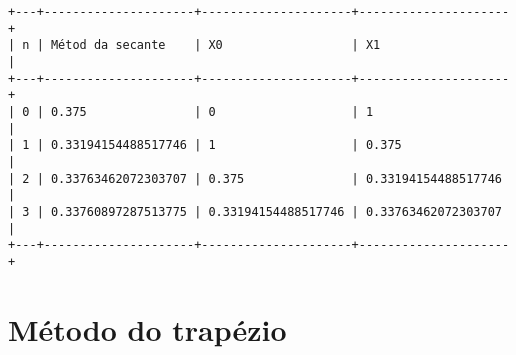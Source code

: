 \documentclass[11pt]{article}
\begin{document}
    \begin{Verbatim}[commandchars=\\\{\}]
+---+---------------------+---------------------+---------------------+
| n | Métod da secante    | X0                  | X1                  |
+---+---------------------+---------------------+---------------------+
| 0 | 0.375               | 0                   | 1                   |
| 1 | 0.33194154488517746 | 1                   | 0.375               |
| 2 | 0.33763462072303707 | 0.375               | 0.33194154488517746 |
| 3 | 0.33760897287513775 | 0.33194154488517746 | 0.33763462072303707 |
+---+---------------------+---------------------+---------------------+
    \end{Verbatim}

    \section{Método do trapézio}\label{muxe9todo-do-trapuxe9zio}
\end{document}
